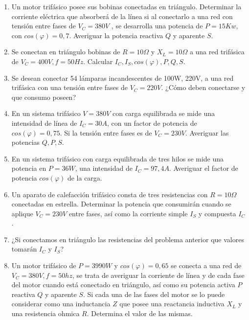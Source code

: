 \documentclass[../main]{subfiles}
\begin{document}
\begin{enumerate}
    \begin{itemize}
        \item ¿Cómo deben conectarse para que la carga esté equilibrada?
        \item Averiguar la corriente simples y compuestas.
        \item Calcular la potencia del conjunto y por fase.
    \end{itemize}
    \item Un motor trifásico posee sus bobinas conectadas en triángulo. Determinar la corriente eléctrica que absorberá de la línea si al conectarlo a una red con tensión entre fases de $V_C=380V$ , se desarrolla una potencia de $P=15Kw$, con $cos(\varphi)=0,7$. Averiguar la potencia reactiva $Q$ y aparente $S$.
    \item Se conectan en triángulo bobinas de $R=10\Omega$ y $X_L=10\Omega$ a una red trifásica de $V_C=400V, f=50Hz$. Calcular $I_C,I_S, cos(\varphi), P,Q,S$.
    \item Se desean conectar 54 lámparas incandescentes de 100W, 220V, a una red trifásica con una tensión entre fases de $V_C=220V$. ¿Cómo deben conectarse y que consumo poseen?
    \item En un sistema trifásico $V=380V$ con carga equilibrada se mide una intensidad de línea de $I_C=30A$, con un factor de potencia de $cos(\varphi)=0,75$. Si la tensión entre fases es de $V_C=230V$. Averiguar las potencias $Q,P,S$.
    \item En un sistema trifásico con carga equilibrada de tres hilos se mide una potencia en $P=36W$, una intensidad de $I_C=97,4A$. Averiguar el factor de potencia $cos(\varphi)$ de la carga.
    \item Un aparato de calefacción trifásico consta de tres resistencias con $R=10\Omega$ conectadas en estrella. Determinar la potencia que consumirán cuando se aplique $V_C=230V$ entre fases, así como la corriente simple $I_S$ y compuesta $I_C$.
    \item ¿Si conectamos en triángulo las resistencias del problema anterior que valores tomarán $I_C$ y $I_S$?
    \item Un motor trifásico de $P=3990W$ y $cos(\varphi)=0,65$ se conecta a una red de $V_C=380V, f=50hz$, se trata de averiguar la corriente de línea y de cada fase del motor cuando está conectado en triángulo, así como su potencia activa $P$ reactiva $Q$ y aparente $S$. Si cada una de las fases del motor se lo puede considerar como una inductancia $Z$ que posee una reactancia inductiva $X_L$ y una resistencia ohmica $R$. Determina el valor de las mismas.

\end{enumerate}
\end{document}
